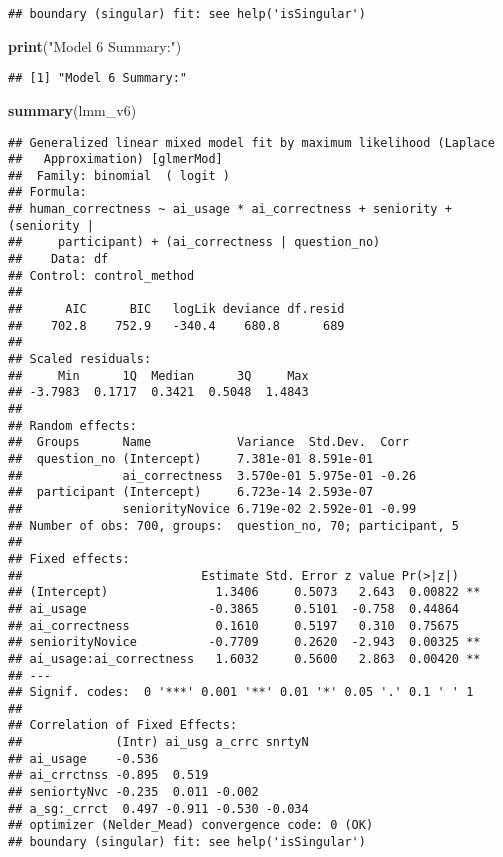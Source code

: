 \documentclass[
]{article}
\newenvironment{Shaded}{\begin{snugshade}}{\end{snugshade}}
\newcommand{\FunctionTok}[1]{\textcolor[rgb]{0.13,0.29,0.53}{\textbf{#1}}}
\newcommand{\NormalTok}[1]{#1}
\newcommand{\StringTok}[1]{\textcolor[rgb]{0.31,0.60,0.02}{#1}}
\begin{document}
\begin{verbatim}
## boundary (singular) fit: see help('isSingular')
\end{verbatim}

\begin{Shaded}
\begin{Highlighting}[]
\FunctionTok{print}\NormalTok{(}\StringTok{"Model 6 Summary:"}\NormalTok{)}
\end{Highlighting}
\end{Shaded}

\begin{verbatim}
## [1] "Model 6 Summary:"
\end{verbatim}

\begin{Shaded}
\begin{Highlighting}[]
\FunctionTok{summary}\NormalTok{(lmm\_v6)}
\end{Highlighting}
\end{Shaded}

\begin{verbatim}
## Generalized linear mixed model fit by maximum likelihood (Laplace
##   Approximation) [glmerMod]
##  Family: binomial  ( logit )
## Formula: 
## human_correctness ~ ai_usage * ai_correctness + seniority + (seniority |  
##     participant) + (ai_correctness | question_no)
##    Data: df
## Control: control_method
## 
##      AIC      BIC   logLik deviance df.resid 
##    702.8    752.9   -340.4    680.8      689 
## 
## Scaled residuals: 
##     Min      1Q  Median      3Q     Max 
## -3.7983  0.1717  0.3421  0.5048  1.4843 
## 
## Random effects:
##  Groups      Name            Variance  Std.Dev.  Corr 
##  question_no (Intercept)     7.381e-01 8.591e-01      
##              ai_correctness  3.570e-01 5.975e-01 -0.26
##  participant (Intercept)     6.723e-14 2.593e-07      
##              seniorityNovice 6.719e-02 2.592e-01 -0.99
## Number of obs: 700, groups:  question_no, 70; participant, 5
## 
## Fixed effects:
##                         Estimate Std. Error z value Pr(>|z|)   
## (Intercept)               1.3406     0.5073   2.643  0.00822 **
## ai_usage                 -0.3865     0.5101  -0.758  0.44864   
## ai_correctness            0.1610     0.5197   0.310  0.75675   
## seniorityNovice          -0.7709     0.2620  -2.943  0.00325 **
## ai_usage:ai_correctness   1.6032     0.5600   2.863  0.00420 **
## ---
## Signif. codes:  0 '***' 0.001 '**' 0.01 '*' 0.05 '.' 0.1 ' ' 1
## 
## Correlation of Fixed Effects:
##             (Intr) ai_usg a_crrc snrtyN
## ai_usage    -0.536                     
## ai_crrctnss -0.895  0.519              
## seniortyNvc -0.235  0.011 -0.002       
## a_sg:_crrct  0.497 -0.911 -0.530 -0.034
## optimizer (Nelder_Mead) convergence code: 0 (OK)
## boundary (singular) fit: see help('isSingular')
\end{verbatim}
\end{document}
